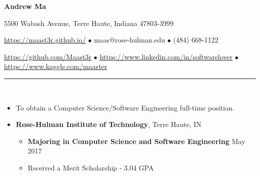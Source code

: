 \documentclass[10pt]{article} %
\begin{document}
\centerline{\LARGE \textbf{Andrew Ma}}  %
\noindent %
\centerline {5500 Wabash Avenue, Terre Haute, Indiana 47803-3999}
\centerline{ \url{https://maast3r.github.io/} $\bullet$ maas@rose-hulman.edu $\bullet$ (484) 668-1122}
\centerline{\url{https://github.com/Maast3r} $\bullet$ \url{https://www.linkedin.com/in/softwarelover} $\bullet$ \url{https://www.kaggle.com/maaster}}

\noindent\rule{16.5cm}{0.4pt} %
\\  %
\begin{itemize}
	\item[] To obtain a Computer Science/Software Engineering full-time position.
\end{itemize}
\normalsize \begin{itemize}
	\item[] \normalsize \textbf{Rose-Hulman Institute of Technology}, Terre Haute, IN
	\begin{itemize}
		\item \normalsize \textbf{Majoring in Computer Science and Software Engineering} \hfill May 2017
		\item \normalsize Received a Merit Scholarship - 3.04 GPA
	\end{itemize}
\end{itemize}
\end{document}
